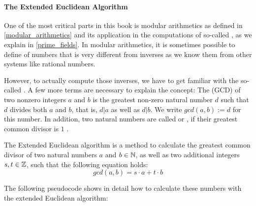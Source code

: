 \paragraph{The Extended Euclidean Algorithm}
One of the most critical parts in this book is modular arithmetics as defined in \ref{modular_arithmetics} and its application in the computations of so-called , as we explain in \ref{prime_fields}. In modular arithmetics, it is sometimes possible to define  of numbers that is very different from inverses as we know them from other systems like rational numbers. 

However, to actually compute those inverses, we have to get familiar with the so-called . A few more terms are necessary to explain the concept: The  (GCD) of two nonzero integers $a$ and $b$ is the greatest non-zero natural number $d$ such that $d$ divides both $a$ and $b$, that is, $d|a$ as well as $d|b$. We write $ gcd (a, b):=d $ for this number. In addition, two natural numbers are called  or , if their greatest common divisor is $1$ .

The Extended Euclidean algorithm is a method to calculate the greatest common divisor of two natural numbers $ a $ and $ b \in \mathbb{N} $, as well as two additional integers $ s, t \in \mathbb{Z} $, such that the following equation holds:
\begin{equation}
\label{eq: erw_Eukl_algo}
gcd (a, b) = s \cdot a + t \cdot b
\end{equation}

The following pseudocode shows in detail how to calculate these numbers with the extended Euclidean algorithm:

